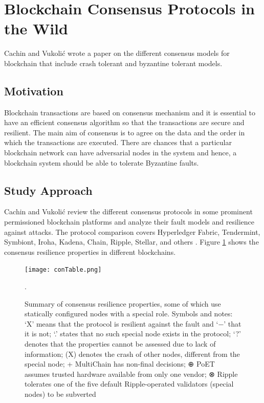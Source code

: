 \documentclass[
  a4paper,  %
  twoside,  %
  bibliography=totoc,
  headsepline,
  cleardoublepage=empty,
  parskip=half,
  draft=false
]{scrbook}
\begin{document}
\section{Blockchain Consensus Protocols in the Wild}
Cachin and Vukoli\'c \cite{Con} wrote a paper on the different consensus models for blockchain that include crash tolerant and byzantine tolerant models.

\subsection{Motivation}
Blockchain transactions are based on consensus mechanism and it is essential to have an efficient consensus algorithm so that the transactions are secure and resilient. The main aim of consensus is to agree on the data and the order in which the transactions are executed. There are chances that a particular blockchain network can have adversarial nodes in the system and hence, a blockchain system should be able to tolerate Byzantine faults. 

\subsection{Study Approach}
Cachin and Vukoli\'c review the different consensus protocols in some prominent permissioned blockchain platforms and analyze their fault models and resilience against attacks. The protocol comparison covers Hyperledger Fabric, Tendermint, Symbiont, Iroha, Kadena, Chain,  Ripple, Stellar, and others \cite{Con}. Figure \ref{fig:conT} shows the consensus resilience properties in different blockchains.

\begin{figure}[h!]
\begin{center}
\texttt{[image: conTable.png]}
\caption{Summary of consensus resilience properties, some of which use statically configured nodes
with a special role. Symbols and notes: ‘X’ means that the protocol is resilient against the fault and ‘−’
that it is not; ‘.’ states that no such special node exists in the protocol; ‘?’ denotes that the properties
cannot be assessed due to lack of information; (X) denotes the crash of other nodes, different from the
special node; + MultiChain has non-final decisions; ⊕ PoET assumes trusted hardware available from
only one vendor; ⊗ Ripple tolerates one of the five default Ripple-operated validators (special nodes) to
be subverted \cite{Con}}.
\label{fig:conT}
\end{center}
\end{figure}
\end{document}

